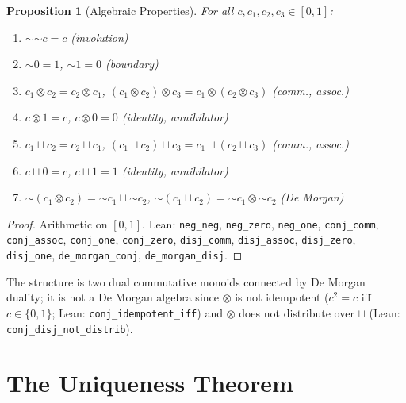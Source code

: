 \documentclass[11pt,a4paper]{article}
\newtheorem{proposition}[theorem]{Proposition}
\newcommand{\negc}{\mathord{\sim}}
\newcommand{\conjc}{\otimes}
\newcommand{\disjc}{\sqcup}
\begin{document}
\begin{proposition}[Algebraic Properties]
\label{thm:algebraic}
For all $c, c_1, c_2, c_3 \in [0,1]$:
\begin{enumerate}[label=(\alph*)]
\item $\negc\negc c = c$ \hfill (involution)
\item $\negc 0 = 1$, $\negc 1 = 0$ \hfill (boundary)
\item $c_1 \conjc c_2 = c_2 \conjc c_1$,
  $(c_1 \conjc c_2) \conjc c_3 = c_1 \conjc (c_2 \conjc c_3)$
  \hfill (comm., assoc.)
\item $c \conjc 1 = c$, $c \conjc 0 = 0$ \hfill (identity, annihilator)
\item $c_1 \disjc c_2 = c_2 \disjc c_1$,
  $(c_1 \disjc c_2) \disjc c_3 = c_1 \disjc (c_2 \disjc c_3)$
  \hfill (comm., assoc.)
\item $c \disjc 0 = c$, $c \disjc 1 = 1$ \hfill (identity, annihilator)
\item $\negc(c_1 \conjc c_2) = \negc c_1 \disjc \negc c_2$,
  $\negc(c_1 \disjc c_2) = \negc c_1 \conjc \negc c_2$ \hfill (De Morgan)
\end{enumerate}
\end{proposition}
\begin{proof}
Arithmetic on $[0,1]$.
Lean: \texttt{neg\_neg}, \texttt{neg\_zero}, \texttt{neg\_one},
\texttt{conj\_comm}, \texttt{conj\_assoc}, \texttt{conj\_one},
\texttt{conj\_zero},
\texttt{disj\_comm}, \texttt{disj\_assoc}, \texttt{disj\_zero},
\texttt{disj\_one},
\texttt{de\_morgan\_conj}, \texttt{de\_morgan\_disj}.
\end{proof}

The structure is two dual commutative monoids connected by De Morgan
duality; it is not a De Morgan algebra since $\conjc$ is not idempotent
($c^2 = c$ iff $c \in \{0,1\}$;
Lean: \texttt{conj\_idempotent\_iff})
and $\conjc$ does not distribute over $\disjc$
(Lean: \texttt{conj\_disj\_not\_distrib}).

\section{The Uniqueness Theorem}
\label{sec:uniqueness}
\end{document}
